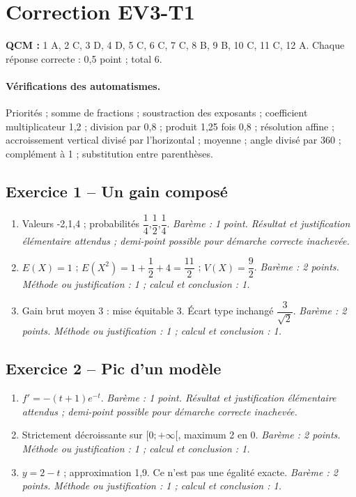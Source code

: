 \mxnewpage\section*{Correction EV3-T1}\label{EV3-T1-CORR}
\textbf{QCM :} 1 A, 2 C, 3 D, 4 D, 5 C, 6 C, 7 C, 8 B, 9 B, 10 C, 11 C, 12 A. Chaque réponse correcte : 0{,}5 point ; total 6.
\paragraph{Vérifications des automatismes.} Priorités ; somme de fractions ; soustraction des exposants ; coefficient multiplicateur 1{,}2 ; division par 0{,}8 ; produit 1{,}25 fois 0{,}8 ; résolution affine ; accroissement vertical divisé par l’horizontal ; moyenne ; angle divisé par 360 ; complément à 1 ; substitution entre parenthèses.
\subsection*{Exercice 1 -- Un gain composé}
\begin{enumerate}
\item Valeurs -2,1,4 ; probabilités $\dfrac{1}{4}$,$\dfrac{1}{2}$,$\dfrac{1}{4}$. \textit{Barème : 1 point. Résultat et justification élémentaire attendus ; demi-point possible pour démarche correcte inachevée.}
\item $E(X)=1$ ; $E(X^2)=1+\dfrac{1}{2}+4=\dfrac{11}{2}$ ; $V(X)=\dfrac{9}{2}$. \textit{Barème : 2 points. Méthode ou justification : 1 ; calcul et conclusion : 1.}
\item Gain brut moyen 3 : mise équitable 3. Écart type inchangé $\dfrac{3}{\sqrt 2}$. \textit{Barème : 2 points. Méthode ou justification : 1 ; calcul et conclusion : 1.}
\end{enumerate}
\subsection*{Exercice 2 -- Pic d’un modèle}
\begin{enumerate}
\item $f\prime=-(t+1)e^{-t}$. \textit{Barème : 1 point. Résultat et justification élémentaire attendus ; demi-point possible pour démarche correcte inachevée.}
\item Strictement décroissante sur $[0;+\infty[$, maximum 2 en 0. \textit{Barème : 2 points. Méthode ou justification : 1 ; calcul et conclusion : 1.}
\item $y=2-t$ ; approximation 1{,}9. Ce n’est pas une égalité exacte. \textit{Barème : 2 points. Méthode ou justification : 1 ; calcul et conclusion : 1.}
\end{enumerate}
